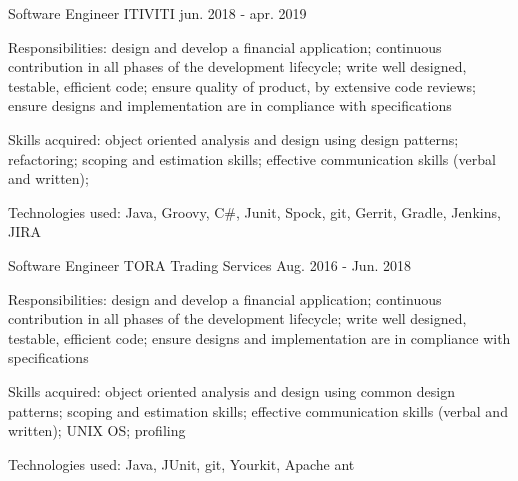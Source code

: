 \begin{cventries}
  \cventry
    {Software Engineer} %
    {ITIVITI} %
    {} %
    {jun. 2018 - apr. 2019} %
    {
      \begin{cvitems} %
        \item {Responsibilities: design and develop a financial application; continuous contribution in all phases of the development lifecycle; write well designed, testable, efficient code; ensure quality of product, by extensive code reviews; ensure designs and implementation are in compliance with specifications}
        \item {Skills acquired: object oriented analysis and design using design patterns; refactoring; scoping and estimation skills; effective communication skills (verbal and written);}
        \item {Technologies used: Java, Groovy, C\#, Junit, Spock, git, Gerrit, Gradle, Jenkins, JIRA}
      \end{cvitems}
    }

  \cventry
    {Software Engineer} %
    {TORA Trading Services} %
    {} %
    {Aug. 2016 - Jun. 2018} %
    {
      \begin{cvitems} %
        \item {Responsibilities: design and develop a financial application; continuous contribution in all phases of the development lifecycle; write well designed, testable, efficient code; ensure designs and implementation are in compliance with specifications}
        \item {Skills acquired: object oriented analysis and design using common design patterns; scoping and estimation skills; effective communication skills (verbal and written); UNIX OS; profiling}
        \item {Technologies used: Java, JUnit, git, Yourkit, Apache ant}
      \end{cvitems}
    }
\end{cventries}
